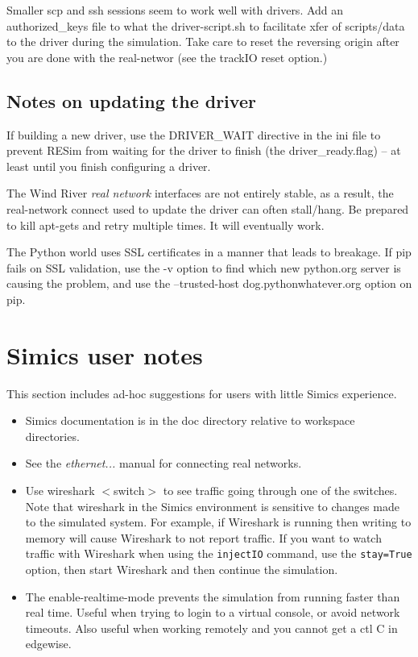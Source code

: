 \documentclass[titlepage]{article}
\begin{document}
\begin{appendices}
Smaller scp and ssh sessions seem to work well with drivers.  Add an authorized\_keys file to what the driver-script.sh to facilitate xfer of scripts/data to the driver
during the simulation.  Take care to reset the reversing origin after you are done with the real-networ (see the trackIO reset option.)

\subsection{Notes on updating the driver}
If building a new driver, use the DRIVER\_WAIT directive in the ini file to prevent RESim from waiting for the driver to finish 
(the driver\_ready.flag) -- at least until you finish configuring a driver.

The Wind River \textit{real network} interfaces are not entirely stable, as a result, the real-network connect used to update the driver can often stall/hang.
Be prepared to kill apt-gets and retry multiple times.  It will eventually work.

The Python world uses SSL certificates in a manner that leads to breakage.  If pip fails on SSL validation, use the -v option
to find which new python.org server is causing the problem, and use the --trusted-host dog.pythonwhatever.org option on pip.

\section{Simics user notes}
This section includes ad-hoc suggestions for users with little Simics experience.
\begin{itemize}
\item Simics documentation is in the doc directory relative to workspace directories.

\item See the \textit{ethernet...} manual for connecting real networks.

\item Use wireshark $<$switch$>$ to see traffic going through one of the switches. Note that wireshark in the Simics environment is sensitive to 
changes made to the simulated system.  For example, if Wireshark is running then writing to memory will cause Wireshark to not report traffic.  
If you want to watch traffic with Wireshark when using the {\tt injectIO} command, use the {\tt stay=True} option, then start Wireshark and then
continue the simulation.

\item The enable-realtime-mode prevents the simulation from running faster than real time.  Useful when trying to login
to a virtual console, or avoid network timeouts.  Also useful when working remotely and you cannot get a ctl C in 
edgewise.


\end{itemize}
\end{appendices}
\end{document}
